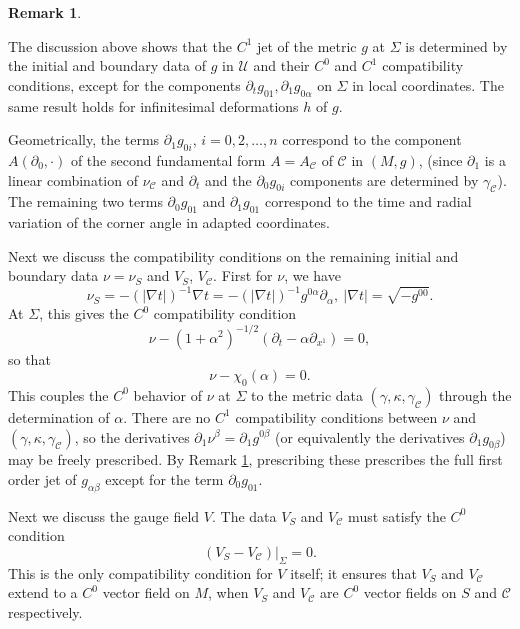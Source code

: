 \documentclass[10pt]{amsart}
\renewcommand{\a}{\alpha}
\renewcommand{\b}{\beta}
\newcommand{\g}{\gamma}
\newcommand{\Si}{\Sigma}
\renewcommand{\k}{\kappa}
\newcommand{\cC}{{\mathcal C}}
\newcommand{\cU}{{\mathcal U}}
\newcommand{\be}{\begin{equation}}
\newcommand{\ee}{\end{equation}}
\newcommand{\p}{\partial}
\newcommand{\<}{\langle}
\renewcommand{\>}{\rangle}
\theoremstyle{plain}
\theoremstyle{remark}
\theoremstyle{definition}
\newtheorem{remark}[lemma]{Remark}
\numberwithin{equation}{section}
\begin{document}
\begin{remark} \label{corner}
{\rm The discussion above shows that the $C^1$ jet of the metric $g$ at $\Si$ is determined by the initial and boundary data of $g$ in $\cU$ and 
their $C^0$ and $C^1$ compatibility conditions, except for the components $\p_t g_{01}, \p_1 g_{0\a}$ on $\Si$ in local coordinates. The same 
result holds for infinitesimal deformations $h$ of $g$. 

  Geometrically, the terms $\p_1 g_{0i}$, $i = 0,2, \dots, n$ correspond to the component $A(\p_0, \cdot)$ of the second fundamental 
form $A = A_{\cC}$ of $\cC$ in $(M, g)$, (since $\p_1$ is a linear combination of $\nu_{\cC}$ and $\p_t$ and the $\p_0 g_{0i}$ components 
are determined by $\g_{\cC}$). The remaining two terms $\p_0 g_{01}$ and $\p_1 g_{01}$ correspond to the time and radial variation of the 
corner angle in adapted coordinates. 
}
\end{remark}

  Next we discuss the compatibility conditions on the remaining initial and boundary data $\nu = \nu_S$ and $V_S$, $V_{\cC}$. First for $\nu$, 
we have  
\be \label{nuS}
\nu_S = -(|\nabla t|)^{-1}\nabla t = -(|\nabla t|)^{-1}g^{0\a}\p_{\a}, \  |\nabla t| = \sqrt{-g^{00}}.
\ee
At $\Si$, this gives the $C^0$ compatibility condition 
\be \label{Comnu}
\nu - (1+\a^2)^{-1/2}(\p_t - \a \p_{x^1}) = 0,
\ee
so that  
$$\nu - \chi_0(\a) = 0.$$
This couples the $C^0$ behavior of $\nu$ at $\Si$ to the metric data $(\g, \k, \g_{\cC})$ through the determination of $\a$. There are no 
$C^1$ compatibility conditions between $\nu$ and $(\g, \k, \g_{\cC})$, so the derivatives $\p_1 \nu^{\b} = \p_1 g^{0\b}$ (or equivalently the derivatives 
$\p_1 g_{0\b}$) may be freely prescribed. By Remark \ref{corner}, prescribing these prescribes the full first order jet of $g_{\a\b}$ except for the term 
$\p_0 g_{01}$. 

  Next we discuss the gauge field $V$. The data $V_S$ and $V_{\cC}$ must satisfy the $C^0$ condition 
\be \label{ComVo}
(V_S - V_{\cC}) |_{\Si} = 0.
\ee
This is the only compatibility condition for $V$ itself; it ensures that $V_S$ and $V_{\cC}$ extend to a $C^0$ vector field on $M$, when 
$V_S$ and $V_{\cC}$ are $C^0$ vector fields on $S$ and $\cC$ respectively. 
  
\end{document}
